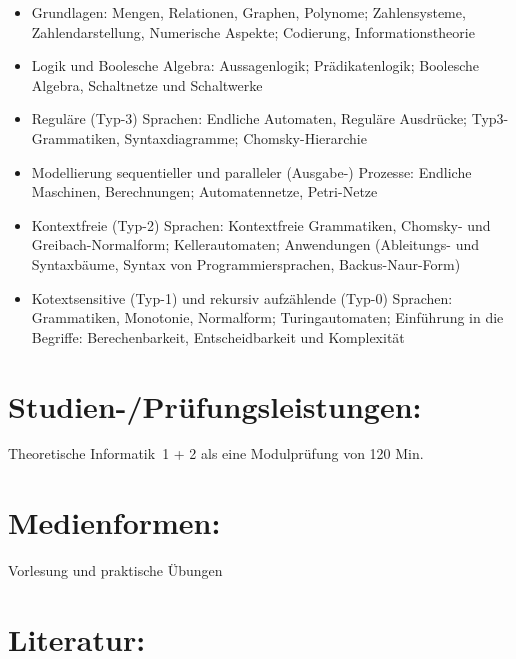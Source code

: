 \begin{itemize}
\item
  Grundlagen: Mengen, Relationen, Graphen, Polynome; Zahlensysteme,
  Zahlendarstellung, Numerische Aspekte; Codierung, Informationstheorie
\item
  Logik und Boolesche Algebra: Aussagenlogik; Prädikatenlogik; Boolesche
  Algebra, Schaltnetze und Schaltwerke
\item
  Reguläre (Typ-3) Sprachen: Endliche Automaten, Reguläre Ausdrücke;
  Typ3-Grammatiken, Syntaxdiagramme; Chomsky-Hierarchie
\item
  Modellierung sequentieller und paralleler (Ausgabe-) Prozesse:
  Endliche Maschinen, Berechnungen; Automatennetze, Petri-Netze
\item
  Kontextfreie (Typ-2) Sprachen: Kontextfreie Grammatiken, Chomsky- und
  Greibach-Normalform; Kellerautomaten; Anwendungen (Ableitungs- und
  Syntaxbäume, Syntax von Programmiersprachen, Backus-Naur-Form)
\item
  Kotextsensitive (Typ-1) und rekursiv aufzählende (Typ-0) Sprachen:
  Grammatiken, Monotonie, Normalform; Turingautomaten; Einführung in die
  Begriffe: Berechenbarkeit, Entscheidbarkeit und Komplexität
\end{itemize}

\section*{Studien-/Prüfungsleistungen:}\label{studien-pruxfcfungsleistungen-22}

Theoretische Informatik~1 + 2 als eine Modulprüfung von 120 Min.

\section*{Medienformen:}\label{medienformen-15}

Vorlesung und praktische Übungen

\section*{Literatur:}\label{literatur-20}

